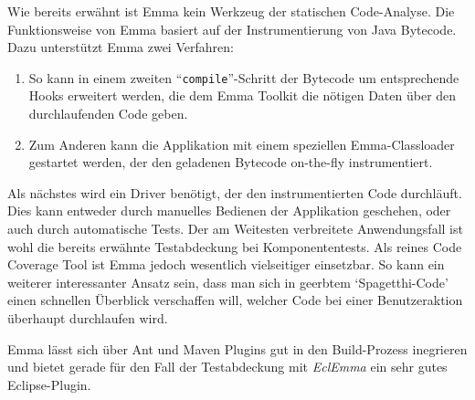 Wie bereits erwähnt ist Emma kein Werkzeug der statischen Code-Analyse. Die Funktionsweise von Emma basiert auf der Instrumentierung von Java Bytecode. Dazu unterstützt Emma zwei Verfahren: \begin{enumerate}
\item So kann in einem zweiten ``\verb=compile=''-Schritt der Bytecode um entsprechende Hooks erweitert werden, die dem Emma Toolkit die nötigen Daten über den durchlaufenden Code geben.
\item Zum Anderen kann die Applikation mit einem speziellen Emma-Classloader gestartet werden, der den geladenen Bytecode on-the-fly instrumentiert. 
\end{enumerate}
Als nächstes wird ein Driver benötigt, der den instrumentierten Code durchläuft. Dies kann entweder durch manuelles Bedienen der Applikation geschehen, oder auch durch automatische Tests. Der am Weitesten verbreitete Anwendungsfall ist wohl die bereits erwähnte Testabdeckung bei Komponententests. Als reines Code Coverage Tool ist Emma jedoch wesentlich vielseitiger einsetzbar. So kann ein weiterer interessanter Ansatz sein, dass man sich in geerbtem `Spagetthi-Code' einen schnellen Überblick verschaffen will, welcher Code bei einer Benutzeraktion überhaupt durchlaufen wird.

Emma lässt sich über Ant und Maven Plugins gut in den Build-Prozess inegrieren und bietet gerade für den Fall der Testabdeckung mit \textit{EclEmma} ein sehr gutes Eclipse-Plugin.


